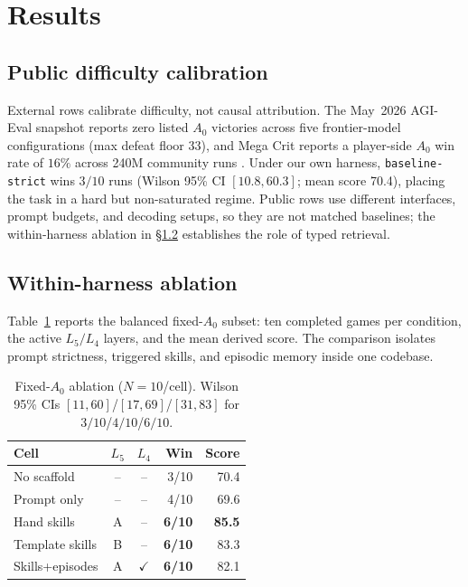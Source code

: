 \section{Results}
\label{sec:results}

\subsection{Public difficulty calibration}
\label{sec:results:cross}

External rows calibrate difficulty, not causal attribution. The
May~2026 AGI-Eval snapshot reports zero listed $A_0$ victories
across five frontier-model configurations
\citep{agi-eval-spire-2026} (max defeat floor 33), and Mega Crit
reports a player-side $A_0$ win rate of $16\%$ across 240M community
runs \citep{megacrit-neowsletter-may2026}. Under our own harness,
\texttt{baseline-strict} wins $3/10$ runs (Wilson 95\% CI
$[10.8,60.3]$; mean score 70.4), placing the task in a hard but
non-saturated regime. Public rows use different interfaces, prompt
budgets, and decoding setups, so they are not matched baselines; the
within-harness ablation in \S\ref{sec:results:scaffold} establishes
the role of typed retrieval.

\subsection{Within-harness ablation}
\label{sec:results:scaffold}

Table~\ref{tab:fivecond} reports the balanced fixed-$A_0$ subset: ten
completed games per condition, the active $L_5/L_4$ layers, and the
mean derived score. The comparison isolates prompt strictness,
triggered skills, and episodic memory inside one codebase.

\begin{table}[!t]
\centering\footnotesize
\caption{Fixed-$A_0$ ablation ($N{=}10$/cell). Wilson 95\% CIs $[11,60]$/$[17,69]$/$[31,83]$ for $3/10$/$4/10$/$6/10$.}
\label{tab:fivecond}
\setlength{\tabcolsep}{3.5pt}
\renewcommand{\arraystretch}{1.0}
\begin{tabular*}{\columnwidth}{@{\extracolsep{\fill}}lccrr@{}}
\toprule
Cell & $L_5$ & $L_4$ & Win & Score \\
\midrule
No scaffold      & -- & -- & 3/10 & 70.4 \\
Prompt only      & -- & -- & 4/10 & 69.6 \\
\midrule
Hand skills      & A  & -- & \textbf{6/10} & \textbf{85.5} \\
Template skills  & B  & -- & \textbf{6/10} & 83.3 \\
Skills+episodes  & A  & $\checkmark$ & \textbf{6/10} & 82.1 \\
\bottomrule
\end{tabular*}
\end{table}


